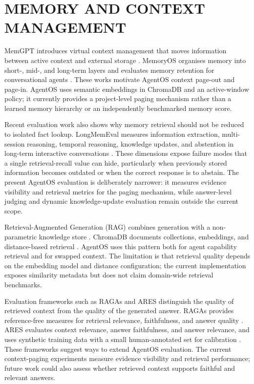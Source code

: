 \section{\uppercase{Memory and Context Management}}
MemGPT introduces virtual context management that moves information between active context and external storage \cite{packer2023memgpt}. MemoryOS organises memory into short-, mid-, and long-term layers and evaluates memory retention for conversational agents \cite{kang2025memoryos}. These works motivate AgentOS context page-out and page-in. AgentOS uses semantic embeddings in ChromaDB and an active-window policy; it currently provides a project-level paging mechanism rather than a learned memory hierarchy or an independently benchmarked memory score.

Recent evaluation work also shows why memory retrieval should not be reduced to isolated fact lookup. LongMemEval measures information extraction, multi-session reasoning, temporal reasoning, knowledge updates, and abstention in long-term interactive conversations \cite{wu2024longmemeval}. These dimensions expose failure modes that a single retrieval-recall value can hide, particularly when previously stored information becomes outdated or when the correct response is to abstain. The present AgentOS evaluation is deliberately narrower: it measures evidence visibility and retrieval metrics for the paging mechanism, while answer-level judging and dynamic knowledge-update evaluation remain outside the current scope.

Retrieval-Augmented Generation (RAG) combines generation with a non-parametric knowledge store \cite{lewis2020rag}. ChromaDB documents collections, embeddings, and distance-based retrieval \cite{chromadocs}. AgentOS uses this pattern both for agent capability retrieval and for swapped context. The limitation is that retrieval quality depends on the embedding model and distance configuration; the current implementation exposes similarity metadata but does not claim domain-wide retrieval benchmarks.

Evaluation frameworks such as RAGAs and ARES distinguish the quality of retrieved context from the quality of the generated answer. RAGAs provides reference-free measures for retrieval relevance, faithfulness, and answer quality \cite{es2024ragas}. ARES evaluates context relevance, answer faithfulness, and answer relevance, and uses synthetic training data with a small human-annotated set for calibration \cite{saadfalcon2024ares}. These frameworks suggest ways to extend AgentOS evaluation. The current context-paging experiments measure evidence visibility and retrieval performance; future work could also assess whether retrieved context supports faithful and relevant answers.

